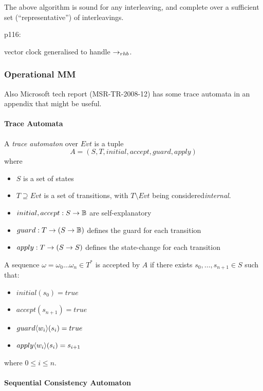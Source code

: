 The above algorithm is sound for any interleaving,
and complete over a sufficient set (``representative'') of interleavings.

p116:

vector clock generalised to handle $\rightarrow_{rhb}$.

\subsubsection{Operational MM}

Also Microsoft tech report (MSR-TR-2008-12)
has some trace automata in an appendix that might be useful.

\paragraph{Trace Automata}

A \emph{trace automaton} over $Evt$ is a tuple
$$
 A = (S,T,initial,accept,guard,apply)
$$
where
\begin{itemize}
  \item $S$ is a set of states
  \item $T \supseteq Evt$ is a set of transitions,
        with $T\setminus Evt$ being considered\emph{internal}.
  \item $initial, accept : S \mathrel{\rightarrow} \mathbb{B}$ are self-explanatory
  \item $guard : T \mathrel{\rightarrow} (S \mathrel{\rightarrow} \mathbb{B})$ defines the guard for each transition
  \item $apply : T \mathrel{\rightarrow} (S \mathrel{\rightarrow} S)$ defines the state-change for each transition
\end{itemize}

A sequence $\omega=\omega_0\dots\omega_n \in T^*$ is accepted by $A$
if there exists $s_0,\dots,s_{n+1} \in S$ such that:
\begin{itemize}
  \item $initial(s_0) = true$
  \item $accept(s_{n+1}) = true$
  \item $guard\langle{w_i}\rangle(s_i) = true$
  \item $apply\langle{w_i}\rangle(s_i) = s_{i+1}$
\end{itemize}
where $ 0 \leq i \leq n$.

\newpage
\paragraph{Sequential Consistency Automaton}


